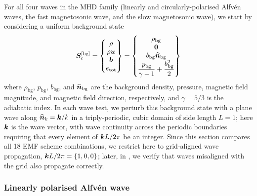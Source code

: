 For all four waves in the MHD family (linearly and circularly-polarised Alfv\'en waves, the fast magnetosonic wave, and the slow magnetosonic wave), we start by considering a uniform background state
\begin{align}
    \bm{S}_\mathrm{c}^{[\mathrm{bg}]}
        = \begin{Bmatrix}
                \rho \\
                \rho \bm{u} \\
                \bm{b} \\
                e_\mathrm{tot}
            \end{Bmatrix}
        = \begin{Bmatrix}
                \rho_\mathrm{bg} \\
                \bm{0} \\
                b_\mathrm{bg} \widehat{\bm{n}}_\mathrm{bg} \\
                \dfrac{p_\mathrm{bg}}{\gamma-1} + \dfrac{b_\mathrm{bg}^2}{2}
            \end{Bmatrix}
\end{align}
where $\rho_\mathrm{bg}$, $p_\mathrm{bg}$, $b_\mathrm{bg}$, and $\widehat{\bm{n}}_\mathrm{bg}$ are the background density, pressure, magnetic field magnitude, and magnetic field direction, respectively, and $\gamma = 5/3$ is the adiabatic index. In each wave test, we perturb this background state with a plane wave along $\widehat{\bm{n}}_k = \bm{k}/k$ in a triply-periodic, cubic domain of side length $L = 1$; here $\bm{k}$ is the wave vector, with wave continuity across the periodic boundaries requiring that every element of $\bm{k}L/2\pi$ be an integer. Since this section compares all 18 EMF scheme combinations, we restrict here to grid-aligned wave propagation, $\bm{k}L/2\pi = \{1,0,0\}$; later, in , we verify that waves misaligned with the grid also propagate correctly.

\subsubsection{Linearly polarised Alfv\'en wave}
\label{sec:scheme-comparison:waves:alfven-linear}

